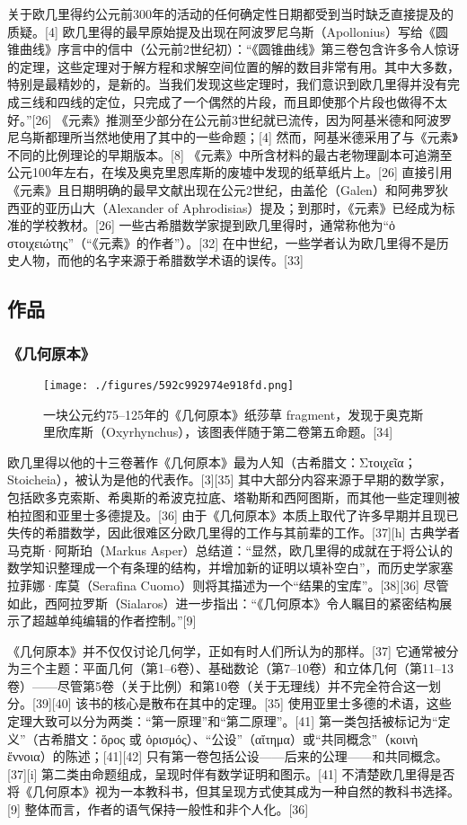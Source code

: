 关于欧几里得约公元前300年的活动的任何确定性日期都受到当时缺乏直接提及的质疑。[4] 欧几里得的最早原始提及出现在阿波罗尼乌斯（Apollonius）写给《圆锥曲线》序言中的信中（公元前2世纪初）：“《圆锥曲线》第三卷包含许多令人惊讶的定理，这些定理对于解方程和求解空间位置的解的数目非常有用。其中大多数，特别是最精妙的，是新的。当我们发现这些定理时，我们意识到欧几里得并没有完成三线和四线的定位，只完成了一个偶然的片段，而且即使那个片段也做得不太好。”[26] 《元素》推测至少部分在公元前3世纪就已流传，因为阿基米德和阿波罗尼乌斯都理所当然地使用了其中的一些命题；[4] 然而，阿基米德采用了与《元素》不同的比例理论的早期版本。[8] 《元素》中所含材料的最古老物理副本可追溯至公元100年左右，在埃及奥克里恩库斯的废墟中发现的纸草纸片上。[26] 直接引用《元素》且日期明确的最早文献出现在公元2世纪，由盖伦（Galen）和阿弗罗狄西亚的亚历山大（Alexander of Aphrodisias）提及；到那时，《元素》已经成为标准的学校教材。[26] 一些古希腊数学家提到欧几里得时，通常称他为“ὁ στοιχειώτης”（“《元素》的作者”）。[32] 在中世纪，一些学者认为欧几里得不是历史人物，而他的名字来源于希腊数学术语的误传。[33]
\subsection{作品}  
\subsubsection{《几何原本》}
\begin{figure}[ht]
\centering
\texttt{[image: ./figures/592c992974e918fd.png]}
\caption{一块公元约75–125年的《几何原本》纸莎草 fragment，发现于奥克斯里欣库斯（Oxyrhynchus），该图表伴随于第二卷第五命题。[34]} \label{fig_Euclid_4}
\end{figure}
欧几里得以他的十三卷著作《几何原本》最为人知（古希腊文：Στοιχεῖα；Stoicheia），被认为是他的代表作。[3][35] 其中大部分内容来源于早期的数学家，包括欧多克索斯、希奥斯的希波克拉底、塔勒斯和西阿图斯，而其他一些定理则被柏拉图和亚里士多德提及。[36] 由于《几何原本》本质上取代了许多早期并且现已失传的希腊数学，因此很难区分欧几里得的工作与其前辈的工作。[37][h] 古典学者马克斯·阿斯珀（Markus Asper）总结道：“显然，欧几里得的成就在于将公认的数学知识整理成一个有条理的结构，并增加新的证明以填补空白”，而历史学家塞拉菲娜·库莫（Serafina Cuomo）则将其描述为一个“结果的宝库”。[38][36] 尽管如此，西阿拉罗斯（Sialaros）进一步指出：“《几何原本》令人瞩目的紧密结构展示了超越单纯编辑的作者控制。”[9]

《几何原本》并不仅仅讨论几何学，正如有时人们所认为的那样。[37] 它通常被分为三个主题：平面几何（第1–6卷）、基础数论（第7–10卷）和立体几何（第11–13卷）——尽管第5卷（关于比例）和第10卷（关于无理线）并不完全符合这一划分。[39][40] 该书的核心是散布在其中的定理。[35] 使用亚里士多德的术语，这些定理大致可以分为两类：“第一原理”和“第二原理”。[41] 第一类包括被标记为“定义”（古希腊文：ὅρος 或 ὁρισμός）、“公设”（αἴτημα）或“共同概念”（κοινὴ ἔννοια）的陈述；[41][42] 只有第一卷包括公设——后来的公理——和共同概念。[37][i] 第二类由命题组成，呈现时伴有数学证明和图示。[41] 不清楚欧几里得是否将《几何原本》视为一本教科书，但其呈现方式使其成为一种自然的教科书选择。[9] 整体而言，作者的语气保持一般性和非个人化。[36]



